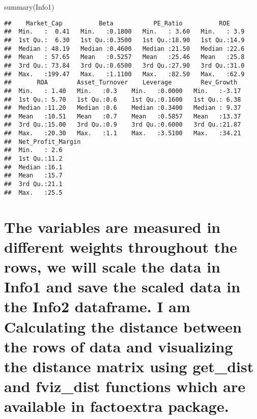 \documentclass[
]{article}
\newenvironment{Shaded}{\begin{snugshade}}{\end{snugshade}}
\newcommand{\FunctionTok}[1]{\textcolor[rgb]{0.00,0.00,0.00}{#1}}
\newcommand{\NormalTok}[1]{#1}
\begin{document}
\begin{Shaded}
\begin{Highlighting}[]
\FunctionTok{summary}\NormalTok{(Info1)}
\end{Highlighting}
\end{Shaded}

\begin{verbatim}
##    Market_Cap          Beta           PE_Ratio          ROE      
##  Min.   :  0.41   Min.   :0.1800   Min.   : 3.60   Min.   : 3.9  
##  1st Qu.:  6.30   1st Qu.:0.3500   1st Qu.:18.90   1st Qu.:14.9  
##  Median : 48.19   Median :0.4600   Median :21.50   Median :22.6  
##  Mean   : 57.65   Mean   :0.5257   Mean   :25.46   Mean   :25.8  
##  3rd Qu.: 73.84   3rd Qu.:0.6500   3rd Qu.:27.90   3rd Qu.:31.0  
##  Max.   :199.47   Max.   :1.1100   Max.   :82.50   Max.   :62.9  
##       ROA        Asset_Turnover    Leverage        Rev_Growth   
##  Min.   : 1.40   Min.   :0.3    Min.   :0.0000   Min.   :-3.17  
##  1st Qu.: 5.70   1st Qu.:0.6    1st Qu.:0.1600   1st Qu.: 6.38  
##  Median :11.20   Median :0.6    Median :0.3400   Median : 9.37  
##  Mean   :10.51   Mean   :0.7    Mean   :0.5857   Mean   :13.37  
##  3rd Qu.:15.00   3rd Qu.:0.9    3rd Qu.:0.6000   3rd Qu.:21.87  
##  Max.   :20.30   Max.   :1.1    Max.   :3.5100   Max.   :34.21  
##  Net_Profit_Margin
##  Min.   : 2.6     
##  1st Qu.:11.2     
##  Median :16.1     
##  Mean   :15.7     
##  3rd Qu.:21.1     
##  Max.   :25.5
\end{verbatim}

\hypertarget{the-variables-are-measured-in-different-weights-throughout-the-rows-we-will-scale-the-data-in-info1-and-save-the-scaled-data-in-the-info2-dataframe.-i-am-calculating-the-distance-between-the-rows-of-data-and-visualizing-the-distance-matrix-using-get_dist-and-fviz_dist-functions-which-are-available-in-factoextra-package.}{%
\section{The variables are measured in different weights throughout the
rows, we will scale the data in Info1 and save the scaled data in the
Info2 dataframe. I am Calculating the distance between the rows of data
and visualizing the distance matrix using get\_dist and fviz\_dist
functions which are available in factoextra
package.}\label{the-variables-are-measured-in-different-weights-throughout-the-rows-we-will-scale-the-data-in-info1-and-save-the-scaled-data-in-the-info2-dataframe.-i-am-calculating-the-distance-between-the-rows-of-data-and-visualizing-the-distance-matrix-using-get_dist-and-fviz_dist-functions-which-are-available-in-factoextra-package.}}
\end{document}
